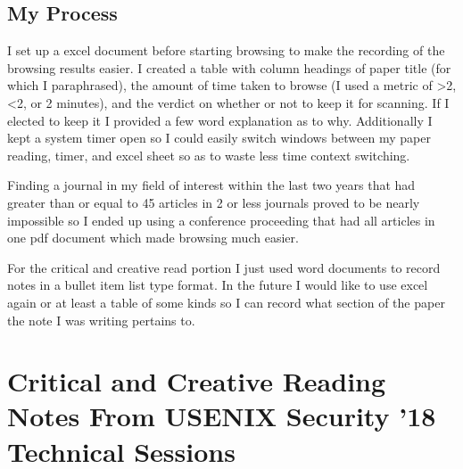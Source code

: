 \documentclass[conference]{IEEEtran}
\begin{document}
\subsection{My Process}
I set up a excel document before starting browsing to make the recording of the browsing results easier. I created a table with column headings of paper title (for which I paraphrased), the amount of time taken to browse (I used a metric of >2, <2, or 2 minutes), and the verdict on whether or not to keep it for scanning. If I elected to keep it I provided a few word explanation as to why. Additionally I kept a system timer open so I could easily switch windows between my paper reading, timer, and excel sheet so as to waste less time context switching.

Finding a journal in my field of interest within the last two years that had greater than or equal to 45 articles in 2 or less journals proved to be nearly impossible so I ended up using a conference proceeding that had all articles in one pdf document which made browsing much easier.

For the critical and creative read portion I just used word documents to record notes in a bullet item list type format. In the future I would like to use excel again or at least a table of some kinds so I can record what section of the paper the note I was writing pertains to.

\section{Critical and Creative Reading Notes From USENIX Security '18 Technical Sessions\cite{noauthor_usenix_2018}}
\end{document}
